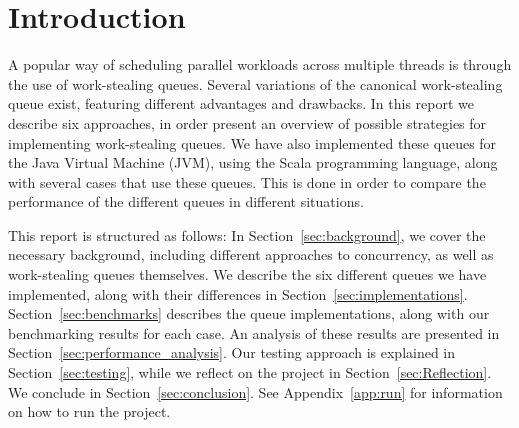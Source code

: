 \section{Introduction}
\label{sec:introduction}
A popular way of scheduling parallel workloads across multiple threads is through the use of work-stealing queues. 
Several variations of the canonical work-stealing queue exist, featuring different advantages and drawbacks.
In this report we describe six approaches, in order present an overview of possible strategies for implementing work-stealing queues.
We have also implemented these queues for the Java Virtual Machine (JVM), using the Scala programming language, along with several cases that use these queues.
This is done in order to compare the performance of the different queues in different situations. 

This report is structured as follows: In Section~\ref{sec:background}, we cover
the necessary background, including different approaches to concurrency, as well
as work-stealing queues themselves. We
describe the six different queues we have implemented, along with their
differences in Section~\ref{sec:implementations}. Section~\ref{sec:benchmarks} describes the queue implementations, along with our benchmarking results for each case. An analysis of
these results are presented in Section~\ref{sec:performance_analysis}. Our
testing approach is explained in Section~\ref{sec:testing}, while we reflect
on the project in Section~\ref{sec:Reflection}. We conclude in 
Section~\ref{sec:conclusion}.
See Appendix~\ref{app:run} for information on how to run the project.
